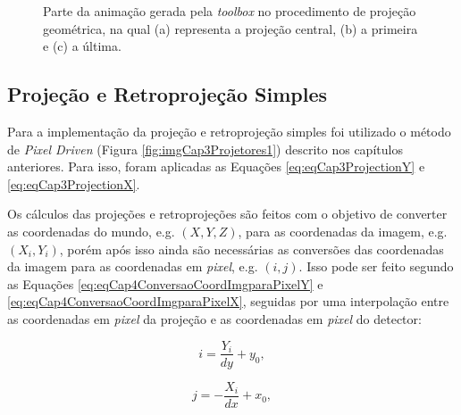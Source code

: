 \begin{figure}[htb]
	\centering
	
	\caption{Parte da animação gerada pela \textit{toolbox} no procedimento de projeção geométrica, na qual (a) representa a projeção central, (b) a primeira e (c) a última.}
	
	
	
	\label{fig:imgCap4GeometriaProjecao}
\end{figure}

\subsection{Projeção e Retroprojeção Simples} 

Para a implementação da projeção e retroprojeção simples foi utilizado o método de \textit{Pixel Driven} (Figura \ref{fig:imgCap3Projetores1}) descrito nos capítulos anteriores. Para isso, foram aplicadas as Equações \ref{eq:eqCap3ProjectionY} e \ref{eq:eqCap3ProjectionX}.

 Os cálculos das projeções e retroprojeções são feitos com o objetivo de converter as coordenadas do mundo, e.g. $(X,Y,Z)$, para as coordenadas da imagem, e.g. $(X_{i},Y_{i})$, porém após isso ainda são necessárias as conversões das coordenadas da imagem para as coordenadas em \textit{pixel}, e.g. $(i,j)$. Isso pode ser feito segundo as Equações \ref{eq:eqCap4ConversaoCoordImgparaPixelY} e \ref{eq:eqCap4ConversaoCoordImgparaPixelX}, seguidas por uma interpolação entre as coordenadas em \textit{pixel} da projeção e as coordenadas em \textit{pixel} do detector:
 
 \begin{equation}
 i = \dfrac{Y_{i}}{dy} + y_{0},  
 \label{eq:eqCap4ConversaoCoordImgparaPixelY}
 \end{equation} 
 
 \begin{equation}
 j = -\dfrac{X_{i}}{dx} + x_{0},
 \label{eq:eqCap4ConversaoCoordImgparaPixelX}
 \end{equation} 
 
